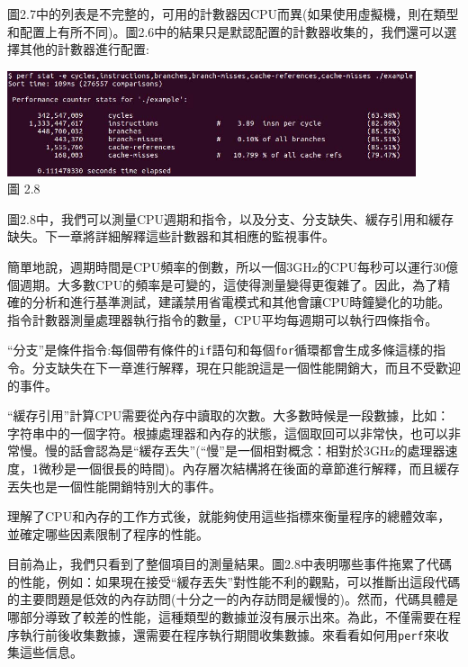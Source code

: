 圖2.7中的列表是不完整的，可用的計數器因CPU而異(如果使用虛擬機，則在類型和配置上有所不同)。圖2.6中的結果只是默認配置的計數器收集的，我們還可以選擇其他的計數器進行配置:

\begin{center}
\includegraphics[width=0.9\textwidth]{content/1/chapter2/images/8.jpg}\\
圖 2.8
\end{center}

圖2.8中，我們可以測量CPU週期和指令，以及分支、分支缺失、緩存引用和緩存缺失。下一章將詳細解釋這些計數器和其相應的監視事件。

簡單地說，週期時間是CPU頻率的倒數，所以一個3GHz的CPU每秒可以運行30億個週期。大多數CPU的頻率是可變的，這使得測量變得更復雜了。因此，為了精確的分析和進行基準測試，建議禁用省電模式和其他會讓CPU時鐘變化的功能。指令計數器測量處理器執行指令的數量，CPU平均每週期可以執行四條指令。

“分支”是條件指令:每個帶有條件的\texttt{if}語句和每個\texttt{for}循環都會生成多條這樣的指令。分支缺失在下一章進行解釋，現在只能說這是一個性能開銷大，而且不受歡迎的事件。

“緩存引用”計算CPU需要從內存中讀取的次數。大多數時候是一段數據，比如：字符串中的一個字符。根據處理器和內存的狀態，這個取回可以非常快，也可以非常慢。慢的話會認為是“緩存丟失”(“慢”是一個相對概念：相對於3GHz的處理器速度，1微秒是一個很長的時間)。內存層次結構將在後面的章節進行解釋，而且緩存丟失也是一個性能開銷特別大的事件。

理解了CPU和內存的工作方式後，就能夠使用這些指標來衡量程序的總體效率，並確定哪些因素限制了程序的性能。

目前為止，我們只看到了整個項目的測量結果。圖2.8中表明哪些事件拖累了代碼的性能，例如：如果現在接受“緩存丟失”對性能不利的觀點，可以推斷出這段代碼的主要問題是低效的內存訪問(十分之一的內存訪問是緩慢的)。然而，代碼具體是哪部分導致了較差的性能，這種類型的數據並沒有展示出來。為此，不僅需要在程序執行前後收集數據，還需要在程序執行期間收集數據。來看看如何用\texttt{perf}來收集這些信息。


